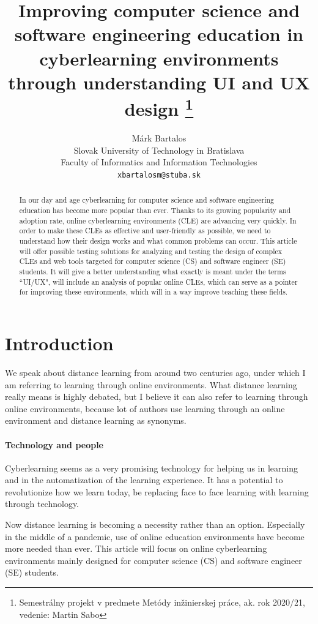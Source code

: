 \documentclass[10pt,english,a4paper]{article}
\title{Improving computer science and software 
engineering education in cyberlearning 
environments through understanding UI and UX design
\thanks{Semestrálny projekt v predmete Metódy inžinierskej práce,
 ak. rok 2020/21, vedenie: Martin Sabo}}
\author{Márk Bartalos \\[2pt]
        \small{Slovak University of Technology in Bratislava}\\
        \small{Faculty of Informatics and Information Technologies}\\
        \small{\texttt{xbartalosm@stuba.sk}}
}
\begin{document}
\maketitle

\begin{abstract}
    In our day and age cyberlearning for computer science and software engineering education has become more popular than ever.
    Thanks to its growing popularity and adoption rate, online cyberlearning environments (CLE) are advancing very quickly.
    In order to make these CLEs as effective and user-friendly as possible, we need to understand how their design
    works and what common problems can occur. This article will offer possible testing solutions for analyzing and testing
    the design of complex CLEs and web tools targeted for computer science (CS) and software engineer (SE) students. 
    It will give a better understanding what exactly is meant under the terms ``UI/UX", will include an analysis of
    popular online CLEs, which can serve as a pointer for improving these environments, which will in a way improve teaching these fields.
    
\end{abstract}



\section{Introduction}
We speak about distance learning from around two centuries ago, under which
I am referring to learning through online environments\cite{moore_2011_elearning}. What distance learning really means is highly debated,
but I believe it can also refer to learning through online environments, because lot of authors use learning through an online environment and distance learning as
synonyms\cite{moore_2011_elearning}\cite{distance_definition}. 
\paragraph{Technology and people}
Cyberlearning seems as a very promising technology for helping us in learning and in the automatization of the learning
experience. It has a potential to revolutionize how we learn today, be replacing face to face learning with
learning through technology.

Now distance learning is becoming a necessity rather than an option. Especially in the middle of a pandemic, use of online 
education environments have become more needed than ever. This article will focus on online cyberlearning environments 
mainly designed for computer science (CS) and software engineer (SE) students.
\end{document}
